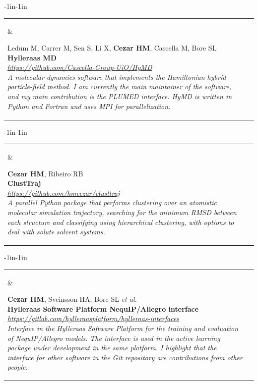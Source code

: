 \documentclass[10pt]{article}
\newcommand{\newsoftware}[3]{
\begin{adjustwidth}{-1in}{-1in}  
\begin{tabular}{p{0.9in}p{7in}}
\parbox[c]{0.9in}{} & \parbox[c]{6in}{\setstretch{0.9} {\scriptsize {#1}} \\ {\bf #2}  \\ {\footnotesize\emph {#3}}}
\end{tabular}
\end{adjustwidth}
\vspace{0.2in}
}
\begin{document}
\newsoftware{Ledum M, Carrer M, Sen S, Li X, \textbf{Cezar HM}, Cascella M, Bore SL}{Hylleraas MD}{\href{https://github.com/Cascella-Group-UiO/HyMD}{https://github.com/Cascella-Group-UiO/HyMD} \\ 
A molecular dynamics software that implements the Hamiltonian hybrid particle-field method. I am currently the main maintainer of the software, and my main contribution is the PLUMED interface. HyMD is written in Python and Fortran and uses MPI for parallelization.}

\newsoftware{\textbf{Cezar HM}, Ribeiro RB}{ClustTraj}{\href{https://github.com/hmcezar/clusttraj}{https://github.com/hmcezar/clusttraj} \\ 
A parallel Python package that performs clustering over an atomistic molecular simulation trajectory, searching for the minimum RMSD between each structure and classifying using hierarchical clustering, with options to deal with solute solvent systems.}

\newsoftware{\textbf{Cezar HM}, Sveinsson HA, Bore SL \textit{et al.}}{Hylleraas Software Platform NequIP/Allegro interface}{\href{https://gitlab.com/hylleraasplatform/hylleraas-interfaces}{https://gitlab.com/hylleraasplatform/hylleraas-interfaces} \\ 
Interface in the Hylleraas Software Platform for the training and evaluation of NequIP/Allegro models. The interface is used in the active learning package under development in the same platform. I highlight that the interface for other software in the Git repository are contributions from other people.}




\end{document}
